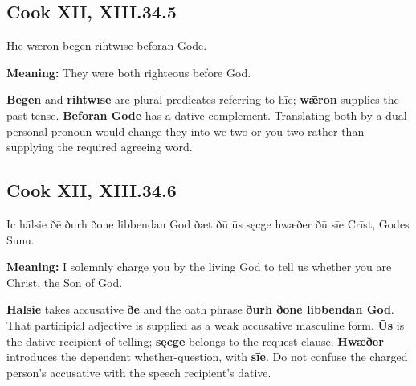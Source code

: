 \par\begin{minipage}{\linewidth}\raggedright
\subsection*{Cook XII, XIII.34.5}

Hīe wǣron bēgen rihtwīse beforan Gode.

\textbf{Meaning:} They were both righteous before God.

\textbf{Bēgen} and \textbf{rihtwīse} are plural predicates referring to hīe; \textbf{wǣron} supplies the past tense. \textbf{Beforan Gode} has a dative complement. Translating both by a dual personal pronoun would change they into we two or you two rather than supplying the required agreeing word.

\end{minipage}\par\addvspace{4pt}

\par\begin{minipage}{\linewidth}\raggedright
\subsection*{Cook XII, XIII.34.6}

Ic hālsie ðē ðurh ðone libbendan God ðæt ðū ūs sęcge hwæðer ðū sīe Crīst, Godes Sunu.

\textbf{Meaning:} I solemnly charge you by the living God to tell us whether you are Christ, the Son of God.

\textbf{Hālsie} takes accusative \textbf{ðē} and the oath phrase \textbf{ðurh ðone libbendan God}. That participial adjective is supplied as a weak accusative masculine form. \textbf{Ūs} is the dative recipient of telling; \textbf{sęcge} belongs to the request clause. \textbf{Hwæðer} introduces the dependent whether-question, with \textbf{sīe}. Do not confuse the charged person’s accusative with the speech recipient’s dative.

\end{minipage}\par\addvspace{4pt}

